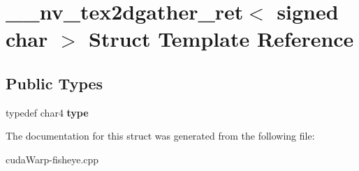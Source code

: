 \hypertarget{struct____nv__tex2dgather__ret_3_01signed_01char_01_4}{}\section{\+\_\+\+\_\+nv\+\_\+tex2dgather\+\_\+ret$<$ signed char $>$ Struct Template Reference}
\label{struct____nv__tex2dgather__ret_3_01signed_01char_01_4}
\subsection*{Public Types}
\begin{DoxyCompactItemize}
\item 
typedef char4 {\bfseries type}\hypertarget{struct____nv__tex2dgather__ret_3_01signed_01char_01_4_a532f399715806c1cdc4fb33e91daa213}{}\label{struct____nv__tex2dgather__ret_3_01signed_01char_01_4_a532f399715806c1cdc4fb33e91daa213}

\end{DoxyCompactItemize}


The documentation for this struct was generated from the following file\+:\begin{DoxyCompactItemize}
\item 
cuda\+Warp-\/fisheye.\+cpp\end{DoxyCompactItemize}
